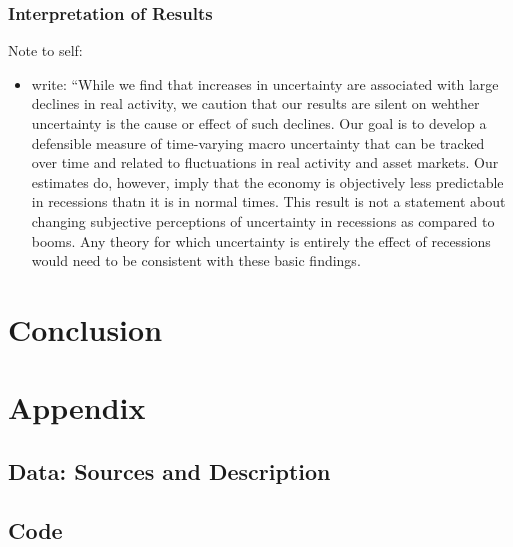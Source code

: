 \documentclass[a4paper,12pt,oneside,pointednumbers,bibtotoc,bigheadings,liststotoc]{scrbook}
\begin{document}
\subsection{Interpretation of Results}
\begingroup
    \fontsize{8pt}{12pt}\selectfont
    Note to self:
\begin{itemize}
	\item \citet[p. 1181]{juradoetal:15} write: ``While we find that increases in uncertainty are associated with large declines in real activity, we caution that our results are silent on wehther uncertainty is the cause or effect of such declines. Our goal is to develop a defensible measure of time-varying macro uncertainty that can be tracked over time and related to fluctuations in real activity and asset markets. Our estimates do, however, imply that the economy is objectively less predictable in recessions thatn it is in normal times. This result is not a statement about changing subjective perceptions of uncertainty in recessions as compared to booms. Any theory for which uncertainty is entirely the effect of recessions would need to be consistent with these basic findings.  
\end{itemize}
\endgroup

\chapter{Conclusion}
\label{Conclusion}




\newpage
\appendix

\chapter{Appendix}
\label{DataAndCode}
\section{Data: Sources and Description}
\label{sec:data}

\section{Code}
\label{sec:rcode}
\end{document}

